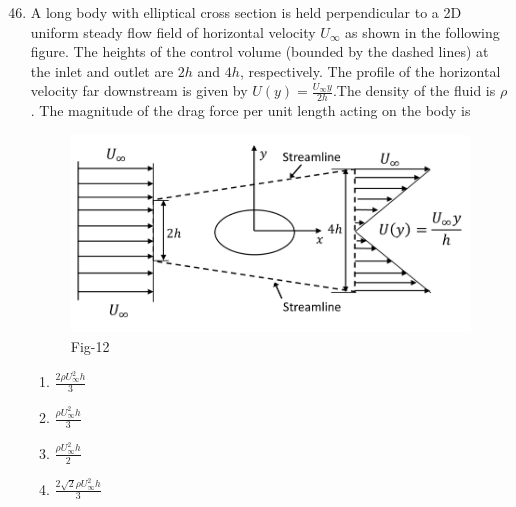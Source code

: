 \documentclass[journal]{IEEEtran}
\theoremstyle{remark}
\begin{document}
\begin{enumerate}[itemsep=1em]
\setcounter{enumi}{45}
\item A long body with elliptical cross section is held perpendicular to a 2D uniform steady flow field of horizontal velocity $U_\infty$ as shown in the following figure. The 
heights of the control volume (bounded by the dashed lines) at the inlet and outlet are $2h$ and $4h$, respectively.  The profile of the horizontal velocity far downstream is given by 
$U(y)=\frac{U_\infty y}{2h}$.The density of the fluid is $\rho$. The magnitude of the drag force per unit length acting on the body is
\begin{figure}[H]
    \centering
    \includegraphics[width=0.5\columnwidth]{figs/fig-12.jpeg}
    \caption*{Fig-12}
    \label{fig-12}
\end{figure}
\begin{multicols}{4}
\begin{enumerate}
     \item $\frac{2\rho U_\infty^2 h}{3}$
     \item $\frac{\rho U_\infty^2 h}{3}$
     \item $\frac{\rho U_\infty^2 h}{2}$
     \item $\frac{2\sqrt{2}\rho U_\infty^2 h}{3}$
\end{enumerate}
\end{multicols}

\end{enumerate}

\newpage
\vspace*{0.25cm}
\end{document}
